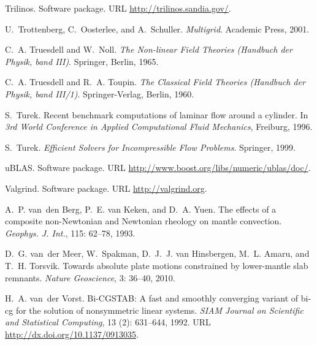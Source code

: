 \begin{thebibliography}{467}
{Trilinos}.
\newblock Software package.
\newblock URL \url{http://trilinos.sandia.gov/}.

U.~Trottenberg, C.~Oosterlee, and A.~Schuller.
\newblock \emph{Multigrid}.
\newblock Academic Press, 2001.

C.~A. Truesdell and W.~Noll.
\newblock \emph{The {N}on-linear {F}ield {T}heories ({H}andbuch der {P}hysik,
  band {I}{I}{I})}.
\newblock Springer, Berlin, 1965.

C.~A. Truesdell and R.~A. Toupin.
\newblock \emph{The {C}lassical {F}ield {T}heories ({H}andbuch der {P}hysik,
  band {I}{I}{I}/1)}.
\newblock Springer-Verlag, Berlin, 1960.

S.~Turek.
\newblock Recent benchmark computations of laminar flow around a cylinder.
\newblock In \emph{3rd World Conference in Applied Computational Fluid
  Mechanics}, Freiburg, 1996.

S.~Turek.
\newblock \emph{Efficient Solvers for Incompressible Flow Problems}.
\newblock Springer, 1999.

uBLAS.
\newblock Software package.
\newblock URL \url{http://www.boost.org/libs/numeric/ublas/doc/}.

Valgrind.
\newblock Software package.
\newblock URL \url{http://valgrind.org}.

A.~P. van~den Berg, P.~E. van Keken, and D.~A. Yuen.
\newblock The effects of a composite non-{N}ewtonian and {N}ewtonian rheology
  on mantle convection.
\newblock \emph{Geophys. J. Int.}, 115: 62--78, 1993.

D.~G. van~der Meer, W.~Spakman, D.~J.~J. van Hinsbergen, M.~L. Amaru, and T.~H.
  Torsvik.
\newblock Towards absolute plate motions constrained by lower-mantle slab
  remnants.
\newblock \emph{Nature Geoscience}, 3: 36--40, 2010.

H.~A. van~der Vorst.
\newblock Bi-{CGSTAB}: A fast and smoothly converging variant of bi-cg for the
  solution of nonsymmetric linear systems.
\newblock \emph{SIAM Journal on Scientific and Statistical Computing},
  13 (2): 631--644, 1992.
\newblock URL \url{http://dx.doi.org/10.1137/0913035}.


\end{thebibliography}
